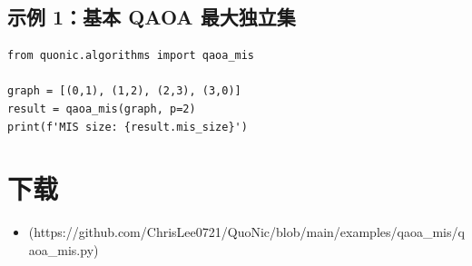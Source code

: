 \documentclass[12pt,a4paper]{article}
\begin{document}
\subsection{示例 1：基本 QAOA 最大独立集}

\begin{verbatim}
from quonic.algorithms import qaoa_mis

graph = [(0,1), (1,2), (2,3), (3,0)]
result = qaoa_mis(graph, p=2)
print(f'MIS size: {result.mis_size}')
\end{verbatim}

\section{下载}

\begin{itemize}
  \item [qaoa\_mis.py](https://github.com/ChrisLee0721/QuoNic/blob/main/examples/qaoa_mis/qaoa_mis.py)
\end{itemize}
\end{document}
